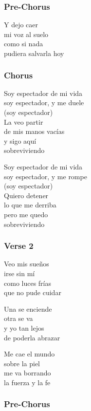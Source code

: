 \subsubsection{Pre-Chorus}\label{pre-chorus-16}

Y dejo caer\\
mi voz al suelo\\
como si nada\\
pudiera salvarla hoy

\subsubsection{Chorus}\label{chorus-38}

Soy espectador de mi vida\\
soy espectador, y me duele\\
(soy espectador)\\
La veo partir\\
de mis manos vacías\\
y sigo aquí\\
sobreviviendo

Soy espectador de mi vida\\
soy espectador, y me rompe\\
(soy espectador)\\
Quiero detener\\
lo que me derriba\\
pero me quedo\\
sobreviviendo

\subsubsection{Verse 2}\label{verse-2-17}

Veo mis sueños\\
irse sin mí\\
como luces frías\\
que no pude cuidar

Una se enciende\\
otra se va\\
y yo tan lejos\\
de poderla abrazar

Me cae el mundo\\
sobre la piel\\
me va borrando\\
la fuerza y la fe

\subsubsection{Pre-Chorus}\label{pre-chorus-17}

